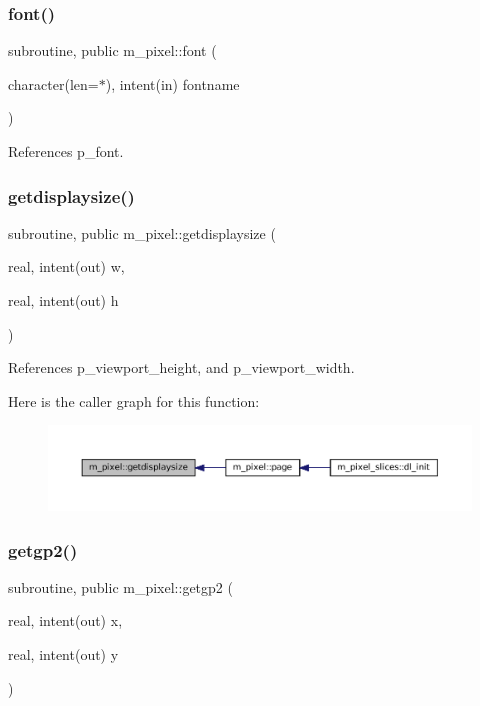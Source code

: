 \subsubsection{\texorpdfstring{font()}{font()}}
{\footnotesize\ttfamily subroutine, public m\+\_\+pixel\+::font (\begin{DoxyParamCaption}\item[{character(len=$\ast$), intent(in)}]{fontname }\end{DoxyParamCaption})}



References p\+\_\+font.

\mbox{\label{namespacem__pixel_acacbc4462423b9aa0f591cbe7aba4ec6}} 
\subsubsection{\texorpdfstring{getdisplaysize()}{getdisplaysize()}}
{\footnotesize\ttfamily subroutine, public m\+\_\+pixel\+::getdisplaysize (\begin{DoxyParamCaption}\item[{real, intent(out)}]{w,  }\item[{real, intent(out)}]{h }\end{DoxyParamCaption})}



References p\+\_\+viewport\+\_\+height, and p\+\_\+viewport\+\_\+width.

Here is the caller graph for this function\+:
\nopagebreak
\begin{figure}[H]
\begin{center}
\leavevmode
\includegraphics[width=350pt]{namespacem__pixel_acacbc4462423b9aa0f591cbe7aba4ec6_icgraph}
\end{center}
\end{figure}
\mbox{\label{namespacem__pixel_a626d769d3dae0c292e3ef1617ad43efb}} 
\subsubsection{\texorpdfstring{getgp2()}{getgp2()}}
{\footnotesize\ttfamily subroutine, public m\+\_\+pixel\+::getgp2 (\begin{DoxyParamCaption}\item[{real, intent(out)}]{x,  }\item[{real, intent(out)}]{y }\end{DoxyParamCaption})}



